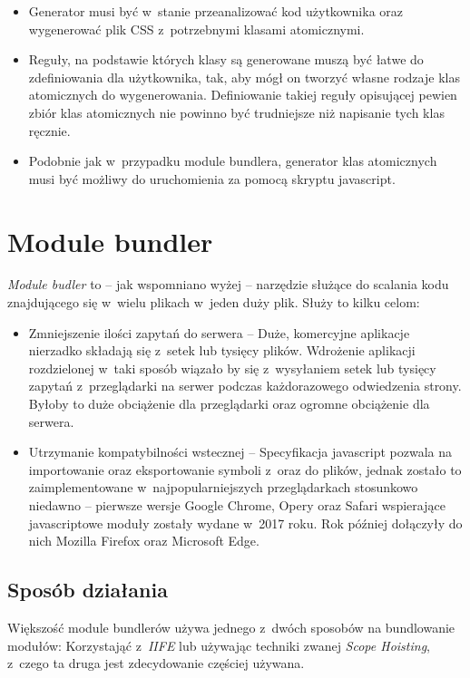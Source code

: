 \documentclass{SGGW-thesis}
\begin{document}
\begin{itemize}
    \begin{itemize}
        \item Generator musi być w~stanie przeanalizować kod użytkownika oraz wygenerować plik CSS z~potrzebnymi klasami atomicznymi.
        \item Reguły, na podstawie których klasy są generowane muszą być łatwe do zdefiniowania dla użytkownika, tak, aby mógł on tworzyć własne rodzaje klas atomicznych do wygenerowania. Definiowanie takiej reguły opisującej pewien zbiór klas atomicznych nie powinno być trudniejsze niż napisanie tych klas ręcznie.
        \item Podobnie jak w~przypadku module bundlera, generator klas atomicznych musi być możliwy do uruchomienia za pomocą skryptu javascript.
    \end{itemize}
\end{itemize}


\chapter{Module bundler}
\emph{Module budler} to -- jak wspomniano wyżej -- narzędzie służące do scalania kodu znajdującego się w~wielu plikach w~jeden duży plik. Służy to kilku celom:
\begin{itemize}
    \item Zmniejszenie ilości zapytań do serwera -- Duże, komercyjne aplikacje nierzadko składają się z~setek lub tysięcy plików. Wdrożenie aplikacji rozdzielonej w~taki sposób wiązało by się z~wysyłaniem setek lub tysięcy zapytań z~przeglądarki na serwer podczas każdorazowego odwiedzenia strony. Byłoby to duże obciążenie dla przeglądarki oraz ogromne obciążenie dla serwera.
    \item Utrzymanie kompatybilności wstecznej -- Specyfikacja javascript pozwala na importowanie oraz eksportowanie symboli z~oraz do plików, jednak zostało to zaimplementowane w~najpopularniejszych przeglądarkach stosunkowo niedawno -- pierwsze wersje Google Chrome, Opery oraz Safari wspierające javascriptowe moduły zostały wydane w~2017 roku. Rok później dołączyły do nich Mozilla Firefox oraz Microsoft Edge.\cite{es6_modules_support}
\end{itemize}


\section{Sposób działania}
Większość module bundlerów używa jednego z~dwóch sposobów na bundlowanie modułów: Korzystająć z~\emph{IIFE} lub używając techniki zwanej \emph{Scope Hoisting}, z~czego ta druga jest zdecydowanie częściej używana\cite{parcel_scope_hoisting}.
\end{document}
